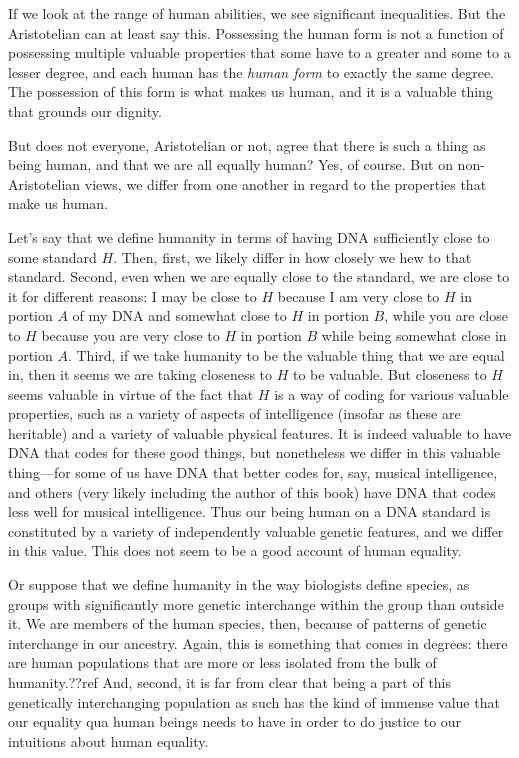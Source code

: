 If we look at the range of human abilities, we see significant inequalities. But the Aristotelian can at least say
this. Possessing the human form is not a function of possessing multiple valuable properties that some have to a 
greater and some to a lesser degree, and each human has the \textit{human form} to exactly the same degree. The 
possession of this form is what makes us human, and it is a valuable thing that grounds our dignity. 

But does not everyone, Aristotelian or not, agree that there is such a thing as being human, and that we are all 
equally human? Yes, of course. But on non-Aristotelian views, we differ from one another in regard to the properties
that make us human. 

Let's say that we define humanity in terms of having DNA sufficiently close to some standard $H$.
Then, first, we likely differ in how closely we hew to that standard. Second, even when we are equally close to the
standard, we are close to it for different reasons: I may be close to $H$ because I am very close to $H$ in portion $A$ of
my DNA and somewhat close to $H$ in portion $B$, while you are close to $H$ because you are very close to $H$ in portion
$B$ while being somewhat close in portion $A$. Third, if we take humanity to be the valuable thing that we are equal in,
then it seems we are taking closeness to $H$ to be valuable. But closeness to $H$ seems valuable in virtue of the fact
that $H$ is a way of coding for various valuable properties, such as a variety of aspects of intelligence (insofar as these
are heritable) and a variety of valuable physical features. It is indeed valuable to have DNA that codes for these good
things, but nonetheless we differ in this valuable thing---for some of us have DNA that better codes for, say, musical
intelligence, and others (very likely including the author of this book) have DNA that codes less well for musical 
intelligence. Thus our being human on a DNA standard is constituted by a variety of independently valuable genetic features,
and we differ in this value. This does not seem to be a good account of human equality.

Or suppose that we define humanity in the way biologists define species, as groups with significantly more genetic interchange
within the group than outside it. We are members of the human species, then, because of patterns of genetic interchange in our
ancestry. Again, this is something that comes in degrees: there are human populations that are more or less isolated from the 
bulk of humanity.??ref And, second, it is far from clear that being a part of this genetically interchanging population as such
has the kind of immense value that our equality qua human beings needs to have in order to do justice to our intuitions about
human equality.


